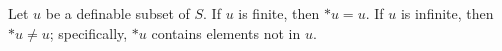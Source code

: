 Let $u$ be a definable subset of $S$. If $u$ is finite, then $*u = u$. If $u$ is infinite, then $*u \neq u$; specifically, $*u$ contains elements not in $u$.
